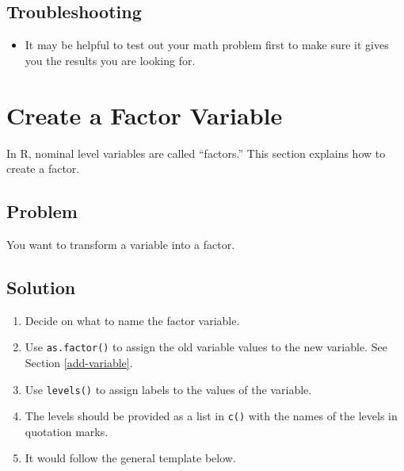 \documentclass[
]{book}
\newenvironment{Shaded}{\begin{snugshade}}{\end{snugshade}}
\newcommand{\CommentTok}[1]{\textcolor[rgb]{0.56,0.35,0.01}{\textit{#1}}}
\newcommand{\FunctionTok}[1]{\textcolor[rgb]{0.13,0.29,0.53}{\textbf{#1}}}
\newcommand{\NormalTok}[1]{#1}
\newcommand{\OtherTok}[1]{\textcolor[rgb]{0.56,0.35,0.01}{#1}}
\newcommand{\SpecialCharTok}[1]{\textcolor[rgb]{0.81,0.36,0.00}{\textbf{#1}}}
\newcommand{\StringTok}[1]{\textcolor[rgb]{0.31,0.60,0.02}{#1}}
\providecommand{\tightlist}{%
  \setlength{\itemsep}{0pt}\setlength{\parskip}{0pt}}
\begin{document}
\hypertarget{troubleshooting-13}{%
\subsection{Troubleshooting}\label{troubleshooting-13}}

\begin{itemize}
\tightlist
\item
  It may be helpful to test out your math problem first to make sure it gives you the results you are looking for.
\end{itemize}

\hypertarget{factor}{%
\section{Create a Factor Variable}\label{factor}}

In R, nominal level variables are called ``factors.'' This section explains how to create a factor.

\hypertarget{problem-17}{%
\subsection{Problem}\label{problem-17}}

You want to transform a variable into a factor.

\hypertarget{solution-16}{%
\subsection{Solution}\label{solution-16}}

\begin{enumerate}
\def\labelenumi{\arabic{enumi}.}
\tightlist
\item
  Decide on what to name the factor variable.
\item
  Use \texttt{as.factor()} to assign the old variable values to the new variable. See Section \ref{add-variable}.
\item
  Use \texttt{levels()} to assign labels to the values of the variable.
\item
  The levels should be provided as a list in \texttt{c()} with the names of the levels in quotation marks.
\item
  It would follow the general template below.
\end{enumerate}

\begin{Shaded}
\end{Shaded}
\end{document}
